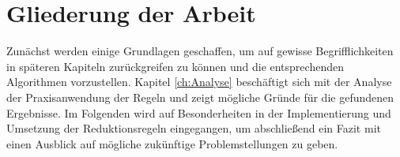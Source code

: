 \section{Gliederung der Arbeit}
\label{ch:Einleitung:sec:Gliederung}

Zunächst werden einige Grundlagen geschaffen, um auf gewisse Begrifflichkeiten in späteren Kapiteln zurückgreifen zu können und die entsprechenden Algorithmen vorzustellen. Kapitel \ref{ch:Analyse} beschäftigt sich mit der Analyse der Praxisanwendung der Regeln und zeigt mögliche Gründe für die gefundenen Ergebnisse. Im Folgenden wird auf Besonderheiten in der Implementierung und Umsetzung der Reduktionsregeln eingegangen, um abschließend ein Fazit mit einen Ausblick auf mögliche zukünftige Problemstellungen zu geben.


